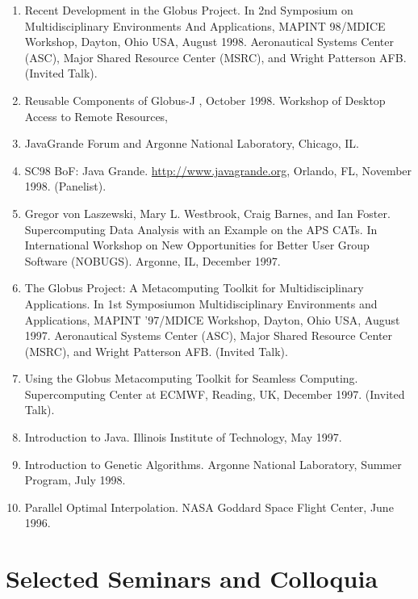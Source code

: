 \documentclass{article}
\begin{document}
\begin{enumerate}
\item  Recent Development in the Globus Project. In 2nd Symposium on Multidisciplinary Environments And Applications, MAPINT 98/MDICE Workshop, Dayton, Ohio USA, August 1998. Aeronautical Systems Center (ASC), Major Shared Resource Center (MSRC), and Wright Patterson AFB. (Invited Talk). 
\item  Reusable Components of Globus-J , October 1998. Workshop of Desktop Access to Remote Resources,  
\item  JavaGrande Forum and Argonne National Laboratory, Chicago, IL.  
\item  SC98 BoF: Java Grande. \url{http://www.javagrande.org}, Orlando, FL, November 1998. (Panelist). 
\item  Gregor von Laszewski, Mary L. Westbrook, Craig Barnes, and Ian Foster. Supercomputing Data Analysis with an Example on the APS CATs. In International Workshop on New Opportunities for Better User Group Software (NOBUGS). Argonne, IL, December 1997.  
\item  The Globus Project: A Metacomputing Toolkit for Multidisciplinary Applications. In 1st Symposiumon Multidisciplinary Environments and Applications, MAPINT '97/MDICE Workshop, Dayton, Ohio USA, August 1997. Aeronautical Systems Center (ASC), Major Shared Resource Center (MSRC), and Wright Patterson AFB. (Invited Talk). 
\item  Using the Globus Metacomputing Toolkit for Seamless Computing. Supercomputing Center at ECMWF, Reading, UK, December 1997. (Invited Talk). 
\item  Introduction to Java. Illinois Institute of Technology, May 1997. 
\item  Introduction to Genetic Algorithms. Argonne National Laboratory, Summer Program, July 1998. 
\item  Parallel Optimal Interpolation. NASA Goddard Space Flight Center, June 1996. 
\end{enumerate}
 
\section{Selected Seminars and Colloquia}
\end{document}
